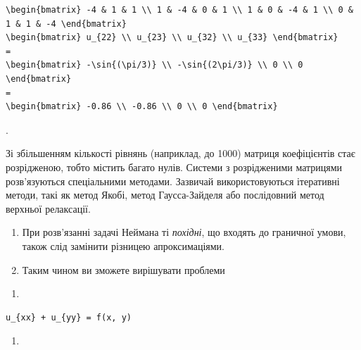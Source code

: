 \documentclass[
  ukrainian,
]{article}
\providecommand{\tightlist}{%
  \setlength{\itemsep}{0pt}\setlength{\parskip}{0pt}}
\begin{document}
\begin{verbatim}
\begin{bmatrix} -4 & 1 & 1 \\ 1 & -4 & 0 & 1 \\ 1 & 0 & -4 & 1 \\ 0 & 1 & 1 & -4 \end{bmatrix}
\begin{bmatrix} u_{22} \\ u_{23} \\ u_{32} \\ u_{33} \end{bmatrix}
=
\begin{bmatrix} -\sin{(\pi/3)} \\ -\sin{(2\pi/3)} \\ 0 \\ 0 \end{bmatrix}
=
\begin{bmatrix} -0.86 \\ -0.86 \\ 0 \\ 0 \end{bmatrix}
\end{verbatim}

.

Зі збільшенням кількості рівнянь (наприклад, до 1000) матриця
коефіцієнтів стає розрідженою, тобто містить багато нулів. Системи з
розрідженими матрицями розв'язуються спеціальними методами. Зазвичай
використовуються ітеративні методи, такі як метод Якобі, метод
Гаусса-Зайделя або послідовний метод верхньої релаксації.

\begin{enumerate}
\def\labelenumi{\arabic{enumi}.}
\setcounter{enumi}{3}
\item
  При розв'язанні задачі Неймана ті \emph{похідні}, що входять до
  граничної умови, також слід замінити різницею апроксимаціями.
\item
  Таким чином ви зможете вирішувати проблеми
\end{enumerate}

\begin{enumerate}
\def\labelenumi{\alph{enumi})}
\tightlist
\item
\end{enumerate}

\begin{verbatim}
u_{xx} + u_{yy} = f(x, y)
\end{verbatim}

\begin{enumerate}
\def\labelenumi{\arabic{enumi})}
\setcounter{enumi}{5}
\tightlist
\item
\end{enumerate}
\end{document}
